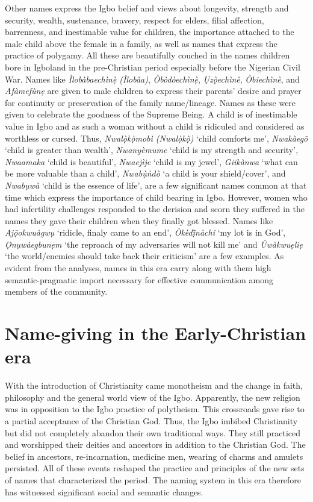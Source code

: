 \documentclass[output=paper]{langscibook}
\begin{document}
Other names express the Igbo belief and views about longevity, strength and security, wealth, sustenance, bravery, respect for elders, filial affection, barrenness, and inestimable value for children, the importance attached to the male child above the female in a family, as well as names that express the practice of polygamy. All these are beautifully couched in the names children bore in Igboland in the pre-Christian period especially before the Nigerian Civil War. Names like \textit{Ìlobàbaechìnẹ̀ (Ìlobàa)}, \textit{Òbòdòechìnẹ̀}, \textit{Ụzọ̀echìnè},  \textit{Òbiechìnè}, and \textit{Afàmefùnẹ} are given to male children to express their parents’ desire and prayer for continuity or preservation of the family name/lineage. Names as these were given to celebrate the goodness of the Supreme Being. A child is of inestimable value in Igbo and as such a woman without a child is ridiculed and considered as worthless or cursed. Thus, \textit{Nwalọ̀kọ̀mobì (Nwalọ̀kọ̀)} ‘child comforts me’, \textit{Nwakàegō} ‘child is greater than wealth’, \textit{Nwanyèmume} ‘child is my strength and security’,  \textit{Nwaamaka} ‘child is beautiful’,  \textit{Nwaejìje} ‘child is my jewel’, \textit{Giikànwa} ‘what can be more valuable than  a child’, \textit{Nwabụ̀ǹdò} ‘a child is your shield/cover’, and \textit{Nwabụwà} ‘child is the essence of life’, are a few significant names common at that time which express the importance of child bearing in Igbo. However, women who had infertility challenges responded to the derision and scorn they suffered in the names they gave their children when they finally got blessed. Names like \textit{Ajọ̄okwuàgwụ} ‘ridicle, finaly came to an end’, \textit{Òkèdị̀nàchi} ‘my lot is in God’, \textit{Ọnụwàegbunẹm} ‘the reproach of my adversaries will not kill me’ and \textit{Ùwàkwuẹliẹ} ‘the world/enemies should take back their criticism’ are a few examples. As evident from the analyses, names in this era carry along with them high semantic-pragmatic import necessary for effective communication among members of the community.

\section{Name-giving in the Early-Christian era}
With the introduction of Christianity came monotheism and the change in faith, philosophy and the general world view of the Igbo. Apparently, the new religion was in opposition to the Igbo practice of polytheism. This crossroads gave rise to a partial acceptance of the Christian God. Thus, the Igbo imbibed Christianity but did not completely abandon their own traditional ways. They still practiced and worshipped their deities and ancestors in addition to the Christian God. The belief in ancestors, re-incarnation, medicine men, wearing of charms and amulets persisted. All of these events reshaped the practice and principles of the new sets of names that characterized the period. The naming system in this era therefore has witnessed significant social and semantic changes. 
\end{document}
